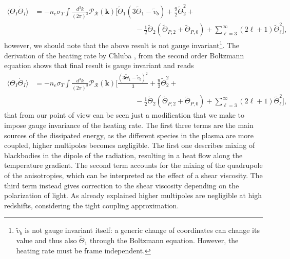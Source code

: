 \begin{align*}
    \langle\Theta_I\dot \Theta_I\rangle&=-n_e\sigma_T\int\frac{d^3k}{(2\pi)^3}\mathcal{P}_\mathcal{R} (\mathbf{k})\bigg[\tilde\Theta_1( 3\tilde\Theta_1-\tilde v_b)+\frac{9}{2}\tilde\Theta_2^2+\nonumber\\&\qquad\qquad\qquad\qquad\qquad\qquad\qquad-\frac{1}{2}\tilde\Theta_2(\tilde\Theta_{P,2}+\tilde\Theta_{P,0})+\sum_{\ell=3}^{\infty}(2\ell+1)\tilde\Theta_\ell^2\bigg],
\end{align*}
however, we should note that the above result is not gauge invariant\footnote{$\tilde v_b$ is not gauge invariant itself: a generic change of coordinates can change its value and thus also $\tilde\Theta_1$ through the Boltzmann equation. However, the heating rate must be frame independent.}. The derivation of the heating rate by Chluba \cite{Chluba_2x2}, from the second order Boltzmann equation shows that final result is gauge invariant and reads
\begin{align}
    \langle\Theta_I\dot \Theta_I\rangle&=-n_e\sigma_T\int\frac{d^3k}{(2\pi)^3}\mathcal{P}_\mathcal{R} (\mathbf{k})\bigg[\frac{( 3\tilde\Theta_1-\tilde v_b)^2}{3}+\frac{9}{2}\tilde\Theta_2^2+\nonumber\\&\qquad\qquad\qquad\qquad\qquad\qquad\qquad-\frac{1}{2}\tilde\Theta_2(\tilde\Theta_{P,2}+\tilde\Theta_{P,0})+\sum_{\ell=3}^{\infty}(2\ell+1)\tilde\Theta_\ell^2\bigg],
    \label{eq:TT_I_average_scalar}
\end{align}
that from our point of view can be seen just a modification that we make to impose gauge invariance of the heating rate. The first three terms are the main sources of the dissipated energy, as the different species in the plasma are more coupled, higher multipoles becomes negligible. The first one describes mixing of blackbodies in the dipole of the radiation, resulting in a heat flow along the temperature gradient. The second term accounts for the mixing of the quadrupole of the anisotropies, which can be interpreted as the effect of a shear viscosity. The third term instead gives correction to the shear viscosity depending on the polarization of light. As already explained higher multipoles are negligible at high redshifts, considering the tight coupling approximation.

